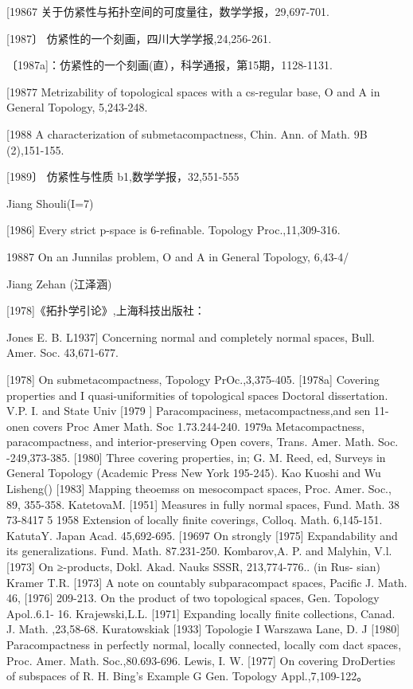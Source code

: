 \documentclass[main.tex]{subfiles}
\begin{document}
[19867 关于仿紧性与拓扑空间的可度量往，数学学报，29,697-701.

[1987〕 仿紧性的一个刻画，四川大学学报,24,256-261.

〔1987a]：仿紧性的一个刻画(直），科学通报，第15期，1128-1131.

[19877 Metrizability of topological spaces with a cs-regular base, O and A
in General Topology, 5,243-248.

[1988 A characterization of submetacompactness, Chin. Ann. of Math. 9B
(2),151-155.

[1989〕 仿紧性与性质 b1,数学学报，32,551-555

\noindent Jiang Shouli(I=7)

[1986] Every strict p-space is 6-refinable. Topology Proc.,11,309-316.

19887 On an Junnilas problem, O and A in General Topology, 6,43-4/

Jiang Zehan (江泽涵)

[1978]《拓扑学引论》,上海科技出版社：

\noindent Jones E. B.
L1937] Concerning normal and completely normal spaces, Bull. Amer. Soc.
43,671-677.

[1978]
On submetacompactness, Topology PrOc.,3,375-405.
[1978a]
Covering properties and
I quasi-uniformities of topological spaces
Doctoral dissertation. V.P. I. and State Univ
[1979 ]
Paracompaciness,
metacompactness,and
sen
11-onen
covers
Proc
Amer Math. Soc
1.73.244-240.
1979a Metacompactness, paracompactness, and
interior-preserving Open
covers, Trans. Amer. Math. Soc. -249,373-385.
[1980]
Three covering properties, in; G. M. Reed, ed, Surveys in General
Topology (Academic Press New York 195-245).
Kao Kuoshi and Wu Lisheng()
[1983]
Mapping theoemss on mesocompact spaces, Proc. Amer. Soc., 89,
355-358.
KatetovaM.
[1951]
Measures in fully normal spaces, Fund. Math. 38 73-8417
5 1958 Extension
of locally finite coverings, Colloq. Math. 6,145-151.
KatutaY.
Japan Acad. 45,692-695.
[19697
On strongly
[1975]
Expandability and its generalizations. Fund. Math. 87.231-250.
Kombarov,A. P. and Malyhin, V.l.
[1973] On ≥-products, Dokl. Akad. Nauks SSSR, 213,774-776.. (in Rus-
sian)
Kramer T.R.
[1973]
A note on countably subparacompact spaces, Pacific J. Math. 46,
[1976]
209-213.
On the product of two topological spaces, Gen. Topology Apol..6.1-
16.
Krajewski,L.L.
[1971] Expanding locally finite collections, Canad. J. Math.
,23,58-68.
Kuratowskiak
[1933]
Topologie I Warszawa
Lane, D. J
[1980] Paracompactness in perfectly normal, locally connected, locally com
dact spaces, Proc. Amer. Math. Soc.,80.693-696.
Lewis, I. W.
[1977]
On covering DroDerties of subspaces of R. H. Bing's Example G
Gen. Topology Appl.,7,109-122。
\end{document}
